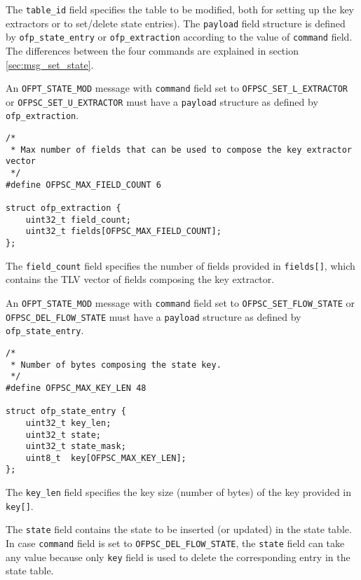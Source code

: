 The \texttt{table\_id} field specifies the table to be modified, both for setting up the key extractors or to set/delete state entries). The \texttt{payload} field structure is defined by \texttt{ofp\_state\_entry} or \texttt{ofp\_extraction} according to the value of \texttt{command} field. The differences between the four commands are explained in section \ref{sec:msg_set_state}.

An \texttt{OFPT\_STATE\_MOD} message with \texttt{command} field set to \texttt{OFPSC\_SET\_L\_EXTRACTOR} or \texttt{OFPSC\_SET\_U\_EXTRACTOR} must have a \texttt{payload} structure as defined by \texttt{ofp\_extraction}.

\begin{verbatim}
/*
 * Max number of fields that can be used to compose the key extractor vector
 */
#define OFPSC_MAX_FIELD_COUNT 6

struct ofp_extraction {
    uint32_t field_count;
    uint32_t fields[OFPSC_MAX_FIELD_COUNT];
};
\end{verbatim}


The \texttt{field\_count} field specifies the number of fields provided in \texttt{fields[]}, which contains the TLV vector of fields composing the key extractor.



An \texttt{OFPT\_STATE\_MOD} message with \texttt{command} field set to \texttt{OFPSC\_SET\_FLOW\_STATE} or \texttt{OFPSC\_DEL\_FLOW\_STATE} must have a \texttt{payload} structure as defined by \texttt{ofp\_state\_entry}.


\begin{verbatim}
/*
 * Number of bytes composing the state key.
 */
#define OFPSC_MAX_KEY_LEN 48

struct ofp_state_entry {
    uint32_t key_len;
    uint32_t state;
    uint32_t state_mask;
    uint8_t  key[OFPSC_MAX_KEY_LEN];
};
\end{verbatim}

The \texttt{key\_len} field specifies the key size (number of bytes) of the key provided in \texttt{key[]}.

The \texttt{state} field contains the state to be inserted (or updated) in the state table. In case \texttt{command} field is set to \texttt{OFPSC\_DEL\_FLOW\_STATE}, the \texttt{state} field can take any value because only \texttt{key} field is used to delete the corresponding entry in the state table.

